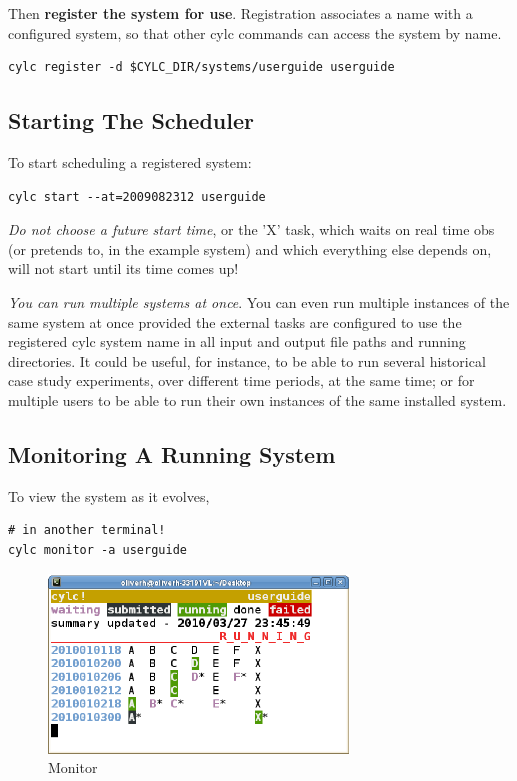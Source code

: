 \documentclass[11pt,a4paper]{article}
\begin{document}
Then {\bf register the system for use}. Registration associates a name
with a configured system, so that other cylc commands can access the
system by name. 

\begin{lstlisting}
cylc register -d $CYLC_DIR/systems/userguide userguide 
\end{lstlisting}

\subsection{Starting The Scheduler}
\label{QuickStartingTheScheduler}

To start scheduling a registered system:
\begin{lstlisting}
cylc start --at=2009082312 userguide
\end{lstlisting}

{\em Do not choose a future start time}, or the 'X' task, which waits on
real time obs (or pretends to, in the example system) and which
everything else depends on, will not start until its time comes up!

{\em You can run multiple systems at once}. You can even run multiple
instances of the same system at once provided the external tasks are
configured to use the registered cylc system name in all input and
output file paths and running directories. It could be useful, for
instance, to be able to run several historical case study experiments,  
over different time periods, at the same time; or for multiple users 
to be able to run their own instances of the same installed system.

\subsection{Monitoring A Running System}
\label{QuickMonitoringARunningSystem}

To view the system as it evolves,
\begin{lstlisting}
# in another terminal!
cylc monitor -a userguide
\end{lstlisting}

\begin{figure} \label{fig-monitor} 
    \begin{center}
        \includegraphics[width=8cm]{monitor-1} 
    \end{center}
    \caption[Monitor]{\small Monitor }
\end{figure} 
\end{document}
